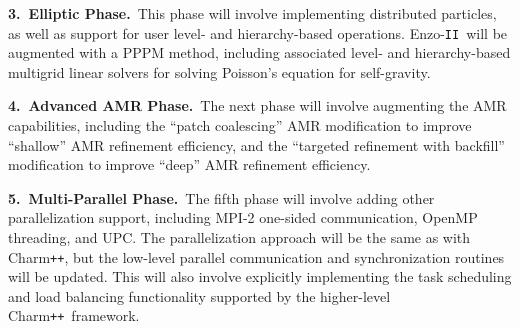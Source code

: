 \documentclass[11pt,letterpaper]{article}
\newcommand{\enzoii}{\textsf{Enzo}-\texttt{II}}
\newcommand{\pp}{\texttt{++}}
\newcommand{\charm}{\textsf{Charm\pp}}
\begin{document}
\textbf{3.~Elliptic Phase.}~This phase will involve implementing
distributed particles, as well as support for user level- and
hierarchy-based operations.  \enzoii\ will be augmented with a PPPM
method, including associated level- and hierarchy-based multigrid
linear solvers for solving Poisson's equation for self-gravity.

\textbf{4.~Advanced AMR Phase.}~The next phase will involve augmenting the
AMR capabilities, including the ``patch coalescing'' AMR modification
to improve ``shallow'' AMR refinement efficiency, and the ``targeted
refinement with backfill'' modification to improve ``deep'' AMR
refinement efficiency.

\textbf{5.~Multi-Parallel Phase.}~The fifth phase will involve adding
other parallelization support, including MPI-2 one-sided
communication, OpenMP threading, and UPC.  The parallelization
approach will be the same as with \charm, but the low-level parallel
communication and synchronization routines will be updated.  This will
also involve explicitly implementing the task scheduling and load
balancing functionality supported by the higher-level \charm\
framework.



%
\end{document}
